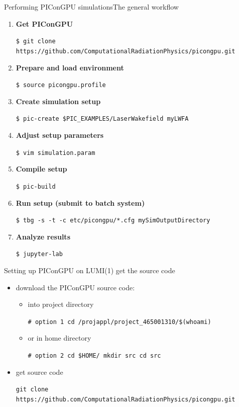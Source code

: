 \documentclass[
  aspectratio=169,
  10pt
]{beamer}
\newcommand{\terminal}[1]{\par\noindent\colorbox{shadecolor}
{\parbox{\dimexpr\textwidth-2\fboxsep\relax}{\texttt{#1}}}}
\begin{document}
\begin{frame}[t,fragile]{Performing PIConGPU simulations}{The general workflow}
\begin{enumerate}
    \item \textbf{Get PIConGPU }\\
        \terminal{\$ git clone  https://github.com/ComputationalRadiationPhysics/picongpu.git}
    \item \textbf{Prepare and load environment}\\
        \terminal{\$ source picongpu.profile}
    \item \textbf{Create simulation setup}\\
        \terminal{\$ pic-create \$PIC\_EXAMPLES/LaserWakefield myLWFA}
    \item \textbf{Adjust setup parameters}\\
        \terminal{\$ vim simulation.param}
    \item \textbf{Compile setup}\\
        \terminal{\$ pic-build}
    \item \textbf{Run setup (submit to batch system)}\\
        \terminal{\$ tbg -s -t -c etc/picongpu/*.cfg mySimOutputDirectory}
    \item \textbf{Analyze results}\\
        \terminal{\$ jupyter-lab}
\end{enumerate}
\end{frame}




\begin{frame}[t,fragile]{Setting up PIConGPU on LUMI}{(1) get the source code}

\begin{itemize}
    \item download the PIConGPU source code:
    \begin{itemize}
        \item into project directory
        \terminal{\# option 1 \newline 
        cd /projappl/project\_465001310/\$(whoami)}
        \item or in home directory
        \terminal{\# option 2 \newline
        cd \$HOME/ \newline
        mkdir src \newline
        cd src}
    \end{itemize}
    \item get source code
    \terminal{git clone https://github.com/ComputationalRadiationPhysics/picongpu.git}
\end{itemize}

\end{frame}
\end{document}
